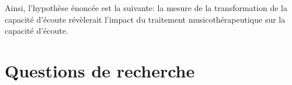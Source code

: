  


 Ainsi, l'hypothèse énoncée est la suivante: la  mesure de la  
 transformation de la capacité d'écoute révèlerait l'impact  du traitement 
 musicothérapeutique sur 
 la capacité d'écoute.











\section*{Questions de recherche}

